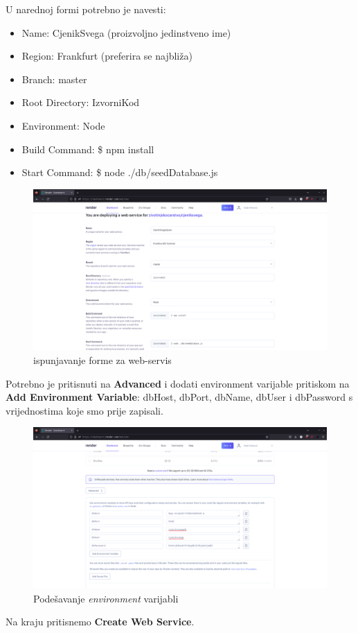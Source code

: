 			U narednoj formi potrebno je navesti: 
			\begin{itemize}
		\item Name: CjenikSvega (proizvoljno jedinstveno ime)
\item Region: Frankfurt (preferira se najbliža)
\item Branch: master
\item Root Directory: IzvorniKod
\item Environment: Node
\item Build Command: \$ npm install
\item Start Command: \$ node ./db/seedDatabase.js
		\end{itemize}
		\begin{figure}[H]
			\includegraphics[width=\textwidth]{slike/konfigws.png} %
			\caption{ispunjavanje forme za web-servis}
			\label{fig:webservis} %
			\end{figure}
			
			Potrebno je pritisnuti na \textbf{Advanced} i dodati environment varijable pritiskom na \textbf{Add Environment Variable}: dbHost, dbPort, dbName, dbUser i dbPassword s vrijednostima koje smo prije zapisali.
			\begin{figure}[H]
			\includegraphics[width=\textwidth]{slike/envvar.png} %
			\caption{Podešavanje \textit{environment} varijabli}
			\label{fig:envvar} %
			\end{figure}
			Na kraju pritisnemo \textbf{Create Web Service}.\\
			
